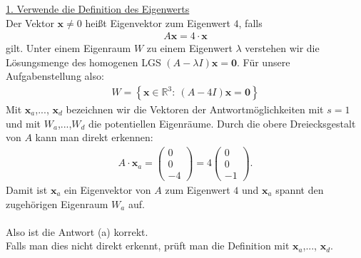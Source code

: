 \underline{1. Verwende die Definition des Eigenwerts}\\
Der Vektor $ \textbf{x} \neq 0 $ heißt Eigenvektor zum Eigenwert $ 4 $, falls
\begin{align*}
	A \textbf{x} = 4 \cdot  \textbf{x}
\end{align*}
gilt. Unter einem Eigenraum $ W $ zu einem Eigenwert $ \lambda $ verstehen wir die Lösungsmenge des homogenen LGS $ (A - \lambda I) \textbf{x}  = \textbf{0}$. Für unsere Aufgabenstellung also:
\begin{align*}
	 W
	=
	\left\{
	\textbf{x} \in \mathbb{R}^3
	:
	\ 
	(A - 4 I) \textbf{x}  = \textbf{0}
	\right\}
\end{align*}
Mit $ \textbf{x}_a $,..., $ \textbf{x}_d $ bezeichnen wir die Vektoren der Antwortmöglichkeiten mit $ s = 1 $ und mit $ W_a $,...,$ W_d $ die potentiellen Eigenräume. 
Durch die obere Dreiecksgestalt von $ A $ kann man direkt erkennen:
\begin{align*}
	A \cdot \textbf{x}_a = 
	\begin{pmatrix}
		0 \\ 0 \\ -4
	\end{pmatrix}
	=
	4
	\begin{pmatrix}
		0 \\ 0 \\ -1
	\end{pmatrix} 
	.
\end{align*}
Damit ist $ \textbf{x}_a $ ein Eigenvektor von $ A $ zum Eigenwert $ 4 $ und $ \textbf{x}_a $ spannt den zugehörigen Eigenraum $ W_a $ auf.\\
\\
Also ist die Antwort (a) korrekt.\\

Falls man dies nicht direkt erkennt, prüft man die Definition mit $ \textbf{x}_a $,..., $ \textbf{x}_d $.


\newpage

